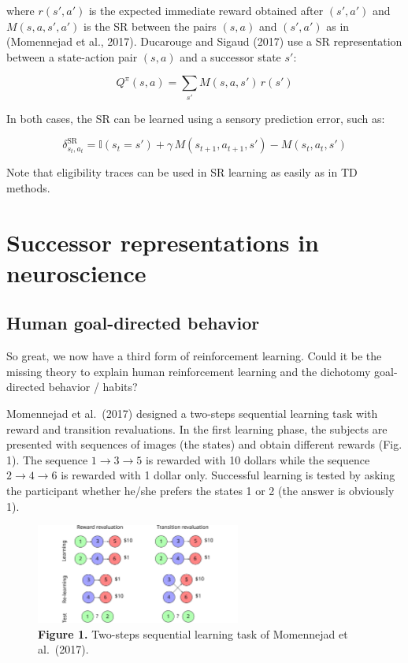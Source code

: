 \documentclass[
  11pt,
]{article}
\begin{document}
where \(r(s', a')\) is the expected immediate reward obtained after
\((s', a')\) and \(M(s, a, s', a')\) is the SR between the pairs
\((s, a)\) and \((s', a')\) as in (Momennejad et al., 2017). Ducarouge
and Sigaud (2017) use a SR representation between a state-action pair
\((s, a)\) and a successor state \(s'\):

\[
    Q^\pi(s, a) = \sum_{s'} M(s, a, s') \, r(s')
\]

In both cases, the SR can be learned using a sensory prediction error,
such as:

\[
    \delta^\text{SR}_{s_t, a_t} = \mathbb{I}(s_t = s') + \gamma \, M(s_{t+1}, a_{t+1}, s') - M(s_t, a_t, s')
\]

Note that eligibility traces can be used in SR learning as easily as in
TD methods.

\hypertarget{successor-representations-in-neuroscience}{%
\section{Successor representations in
neuroscience}\label{successor-representations-in-neuroscience}}

\hypertarget{human-goal-directed-behavior}{%
\subsection{Human goal-directed
behavior}\label{human-goal-directed-behavior}}

So great, we now have a third form of reinforcement learning. Could it
be the missing theory to explain human reinforcement learning and the
dichotomy goal-directed behavior / habits?

Momennejad et al.~(2017) designed a two-steps sequential learning task
with reward and transition revaluations. In the first learning phase,
the subjects are presented with sequences of images (the states) and
obtain different rewards (Fig. 1). The sequence
\(1 \rightarrow 3 \rightarrow 5\) is rewarded with 10 dollars while the
sequence \(2 \rightarrow 4 \rightarrow 6\) is rewarded with 1 dollar
only. Successful learning is tested by asking the participant whether
he/she prefers the states 1 or 2 (the answer is obviously 1).

\begin{figure}
\centering
\includegraphics[width=0.6\textwidth,height=\textheight]{img/sr_momennejad.svg}
\caption{\textbf{Figure 1.} Two-steps sequential learning task of
Momennejad et al.~(2017).}
\end{figure}
\end{document}
